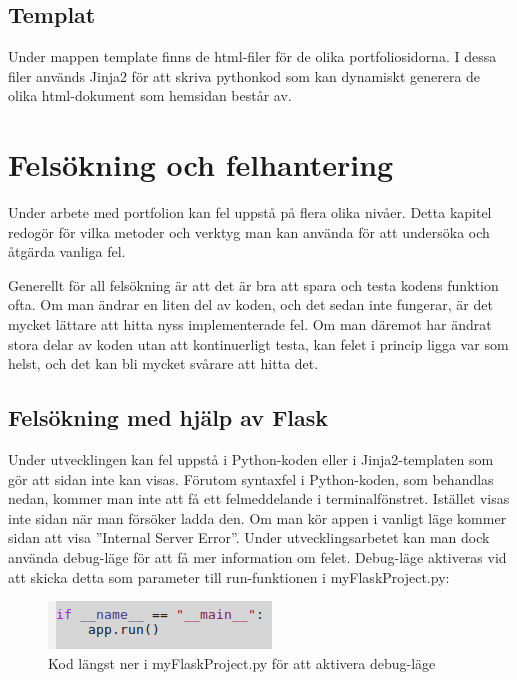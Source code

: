 \documentclass{TDP003mall}
\begin{document}
\subsection{Templat}

Under mappen template finns de html-filer för de olika portfoliosidorna. I dessa filer används Jinja2 för att skriva pythonkod som kan dynamiskt generera de olika html-dokument som hemsidan består av.





\section{Felsökning och felhantering}

Under arbete med portfolion kan fel uppstå på flera olika nivåer. Detta kapitel redogör för vilka metoder och verktyg man kan använda för att undersöka och åtgärda vanliga fel.

Generellt för all felsökning är att det är bra att spara och testa kodens funktion ofta. Om man ändrar en liten del av koden, och det sedan inte fungerar, är det mycket lättare att hitta nyss implementerade fel. Om man däremot har ändrat stora delar av koden utan att kontinuerligt testa, kan felet i princip ligga var som helst, och det kan bli mycket svårare att hitta det.


\subsection{Felsökning med hjälp av Flask}
Under utvecklingen kan fel uppstå i Python-koden eller i Jinja2-templaten som gör att sidan inte kan visas. Förutom syntaxfel i Python-koden, som behandlas nedan, kommer man inte att få ett felmeddelande i terminalfönstret. Istället visas inte sidan när man försöker ladda den. Om man kör appen i vanligt läge kommer sidan att visa ''Internal Server Error''. Under utvecklingsarbetet kan man dock använda debug-läge för att få mer information om felet. Debug-läge aktiveras vid att skicka detta som parameter till run-funktionen i myFlaskProject.py:

\begin{figure}
  \centering
  \includegraphics{debugmode}
  \caption{Kod längst ner i myFlaskProject.py för att aktivera debug-läge}
\end{figure}
\end{document}
